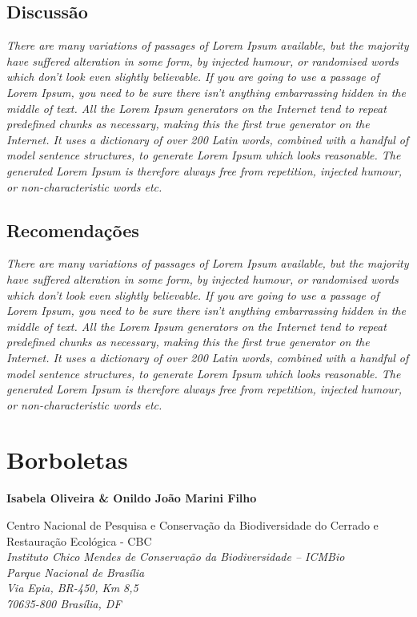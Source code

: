 \documentclass[
  letterpaper,
]{scrbook}
\begin{document}
\section{Discussão}\label{discussuxe3o}

\emph{There are many variations of passages of Lorem Ipsum available,
but the majority have suffered alteration in some form, by injected
humour, or randomised words which don't look even slightly believable.
If you are going to use a passage of Lorem Ipsum, you need to be sure
there isn't anything embarrassing hidden in the middle of text. All the
Lorem Ipsum generators on the Internet tend to repeat predefined chunks
as necessary, making this the first true generator on the Internet. It
uses a dictionary of over 200 Latin words, combined with a handful of
model sentence structures, to generate Lorem Ipsum which looks
reasonable. The generated Lorem Ipsum is therefore always free from
repetition, injected humour, or non-characteristic words etc.}

\section{Recomendações}\label{recomendauxe7uxf5es}

\emph{There are many variations of passages of Lorem Ipsum available,
but the majority have suffered alteration in some form, by injected
humour, or randomised words which don't look even slightly believable.
If you are going to use a passage of Lorem Ipsum, you need to be sure
there isn't anything embarrassing hidden in the middle of text. All the
Lorem Ipsum generators on the Internet tend to repeat predefined chunks
as necessary, making this the first true generator on the Internet. It
uses a dictionary of over 200 Latin words, combined with a handful of
model sentence structures, to generate Lorem Ipsum which looks
reasonable. The generated Lorem Ipsum is therefore always free from
repetition, injected humour, or non-characteristic words etc.}


\chapter{Borboletas}\label{borboletas}

\textbf{Isabela Oliveira \& Onildo João Marini Filho}

Centro Nacional de Pesquisa e Conservação da Biodiversidade do Cerrado e
Restauração Ecológica - CBC\\
\emph{Instituto Chico Mendes de Conservação da Biodiversidade --
ICMBio}\\
\emph{Parque Nacional de Brasília}\\
\emph{Via Epia, BR-450, Km 8,5}\\
\emph{70635-800 Brasília, DF}
\end{document}
